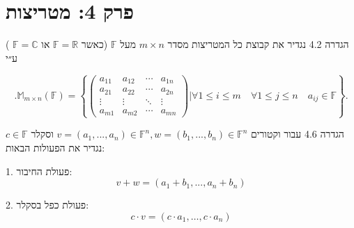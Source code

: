 \documentclass[a4paper, 11pt]{article}
\newcommand{\Set}[1]{\left\{#1\right\}}
\begin{document}
\newpage

\section{פרק 4: מטריצות}

\begin{envbox}[defcolor]{הגדרה 4.2}
נגדיר את קבוצת כל המטריצות מסדר $m\times n$ מעל $\mathbb{F}$ (כאשר $\mathbb{F}=\mathbb{R}$ או $\mathbb{F}=\mathbb{C}$ ) ע״י

\[
.\mathbb{M}_{m\times n}(\mathbb{F})=\Set{\begin{pmatrix}a_{11} & a_{12} & \cdots & a_{1n}\\
a_{21} & a_{22} & \cdots & a_{2n}\\
\vdots & \vdots & \ddots & \vdots\\
a_{m1} & a_{m2} & \cdots & a_{mn}
\end{pmatrix}|\forall 1\leq i\leq m \quad \forall 1\leq j\leq n \quad a_{ij}\in \mathbb{F}}.
\]
\end{envbox}

\begin{envbox}[defcolor]{הגדרה 4.6}
עבור וקטורים $v=(a_1,...,a_n)\in\mathbb{F}^n,w=(b_1,...,b_n)\in\mathbb{F}^n$ וסקלר $c\in\mathbb{F}$ נגדיר את הפעולות הבאות:

1.  פעולת החיבור: 
\[
v+w=(a_1+b_1,...,a_n+b_n)
\]

2.  פעולת כפל בסקלר: 
\[
c \cdot v=(c\cdot a_1,\dots,c\cdot a_n)
\]
\end{envbox}
\end{document}
